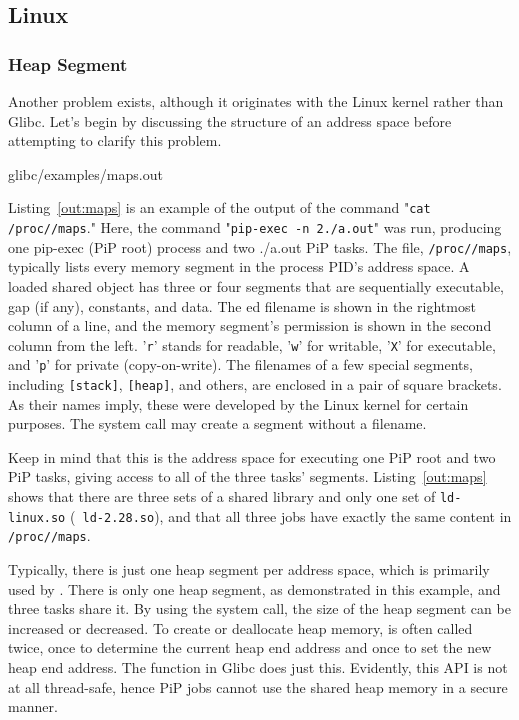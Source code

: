 \subsection{Linux}

\subsubsection{Heap Segment}\label{sec:heap}

Another problem exists, although it originates with the Linux kernel
rather than Glibc. Let's begin by discussing the structure of an
address space before attempting to clarify this problem.

 {glibc/examples/maps.out}

Listing~\ref{out:maps} is an example of the output of the command
"{\tt cat /proc//maps}." Here, the command "{\tt pip-exec
  -n 2./a.out}" was run, producing one pip-exec (PiP root) process and
two ./a.out PiP tasks. The file, {\tt /proc//maps},
typically lists every memory segment in the process 
PID's address space. A loaded shared object has three or four segments
that are sequentially executable, gap (if any), constants, and
data. The ed filename is shown in the rightmost column
of a line, and the memory segment's permission is shown in the second
column from the left. '{\tt r}' stands for readable, '{\tt w}' for
writable, '{\tt X}' for executable, and '{\tt p}' for private
(copy-on-write). The filenames of a few special segments, including
{\tt [stack]}, {\tt [heap]}, and others, are enclosed in a pair of
square brackets. As their names imply, these were developed by the
Linux kernel for certain purposes. The  system call
may create a segment without a filename. 

Keep in mind that this is the address space for executing one PiP root
and two PiP tasks, giving access to all of the three tasks'
segments. Listing~\ref{out:maps} shows that there are three sets of a
shared library and only one set of {\tt ld-linux.so} ({\tt
  ld-2.28.so}), and that all three jobs have exactly the same content
in {\tt /proc//maps}. 

Typically, there is just one heap segment per address space, which is
primarily used by . There is only one heap segment, as
demonstrated in this example, and three tasks share it.
By using the  system call, the size of the heap segment
can be increased or decreased. To create or deallocate heap memory,
 is often called twice, once to determine the current
heap end address and once to set the new heap end address. The
 function in Glibc does just this. Evidently, this API
is not at all thread-safe, hence PiP jobs cannot use the shared heap
memory in a secure manner.  

